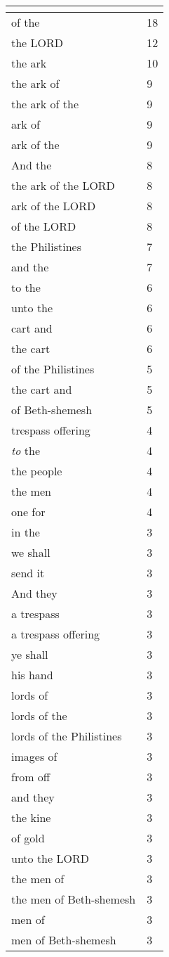 \begin{center}
\begin{longtable}{|p{3.0in}|p{0.5in}|}
\hline \multicolumn{2}{c}{{ }} \\ \hline
\endfoot 
of the & 18\\ \hline 
the LORD & 12\\ \hline 
the ark & 10\\ \hline 
the ark of & 9\\ \hline 
the ark of the & 9\\ \hline 
ark of & 9\\ \hline 
ark of the & 9\\ \hline 
And the & 8\\ \hline 
the ark of the LORD & 8\\ \hline 
ark of the LORD & 8\\ \hline 
of the LORD & 8\\ \hline 
the Philistines & 7\\ \hline 
and the & 7\\ \hline 
to the & 6\\ \hline 
unto the & 6\\ \hline 
cart and & 6\\ \hline 
the cart & 6\\ \hline 
of the Philistines & 5\\ \hline 
the cart and & 5\\ \hline 
of Beth-shemesh & 5\\ \hline 
trespass offering & 4\\ \hline 
\emph{to} the & 4\\ \hline 
the people & 4\\ \hline 
the men & 4\\ \hline 
one for & 4\\ \hline 
in the & 3\\ \hline 
we shall & 3\\ \hline 
send it & 3\\ \hline 
And they & 3\\ \hline 
a trespass & 3\\ \hline 
a trespass offering & 3\\ \hline 
ye shall & 3\\ \hline 
his hand & 3\\ \hline 
lords of & 3\\ \hline 
lords of the & 3\\ \hline 
lords of the Philistines & 3\\ \hline 
images of & 3\\ \hline 
from off & 3\\ \hline 
and they & 3\\ \hline 
the kine & 3\\ \hline 
of gold & 3\\ \hline 
unto the LORD & 3\\ \hline 
the men of & 3\\ \hline 
the men of Beth-shemesh & 3\\ \hline 
men of & 3\\ \hline 
men of Beth-shemesh & 3\\ \hline 
\end{longtable}
\end{center}





